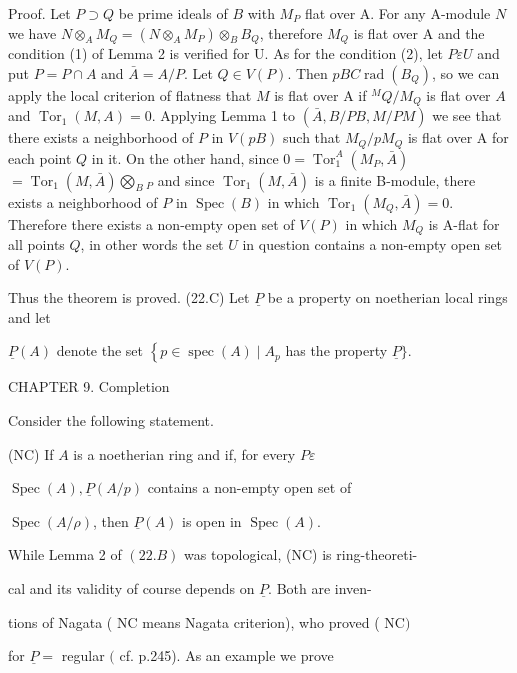 Proof. Let $P \supset Q$ be prime ideals of $B$ with $M_{P}$ flat over A. For any A-module $N$ we have $N \otimes_{A} M_{Q}=\left(N \otimes_{A} M_{P}\right) \otimes_{B} B_{Q}$, therefore $M_{Q}$ is flat over A and the condition (1) of Lemma 2 is verified for U. As for the condition (2), let $P \varepsilon U$ and put $P=P \cap A$ and $\bar{A}=A / P$. Let $Q \in V(P)$. Then $p B C \operatorname{rad}\left(B_{Q}\right)$, so we can apply the local criterion of flatness that $M$ is flat over A if ${ }^{M} Q / M_{Q}$ is flat over $A$ and $\operatorname{Tor}_{1}(M, A)=0$. Applying Lemma 1 to $(\bar{A}, B / P B, M / P M)$ we see that there exists a neighborhood of $P$ in $V(p B)$ such that $M_{Q} / p M_{Q}$ is flat over A for each point $Q$ in it. On the other hand, since $0=\operatorname{Tor}_{1}^{A}\left(M_{P}, \bar{A}\right)$ $=\operatorname{Tor}_{1}(M, \bar{A}) \bigotimes_{B}{ }_{P}$ and since $\operatorname{Tor}_{1}(M, \bar{A})$ is a finite B-module, there exists a neighborhood of $P$ in $\operatorname{Spec}(B)$ in which $\operatorname{Tor}_{1}\left(M_{Q}, \bar{A}\right)=0$. Therefore there exists a non-empty open set of $V(P)$ in which $M_{Q}$ is A-flat for all points $Q$, in other words the set $U$ in question contains a non-empty open set of $V(P)$.

Thus the theorem is proved. (22.C) Let $\underline{P}$ be a property on noetherian local rings and let

$\underline{P}(A)$ denote the set $\left\{p \in \operatorname{spec}(A) \mid A_{p}\right.$ has the property $\underline{P}\}$.

CHAPTER 9. Completion

Consider the following statement.

(NC) If $A$ is a noetherian ring and if, for every $P \varepsilon$

$\operatorname{Spec}(A), \underline{P}(A / p)$ contains a non-empty open set of

$\operatorname{Spec}(A / \rho)$, then $\underline{P}(A)$ is open in $\operatorname{Spec}(A) .$

While Lemma 2 of $(22 . B)$ was topological, (NC) is ring-theoreti-

cal and its validity of course depends on $\underline{P}$. Both are inven-

tions of Nagata ( $\mathrm{NC}$ means Nagata criterion), who proved ( $\mathrm{NC})$

for $\underline{P}=$ regular $($ cf. p.245). As an example we prove

